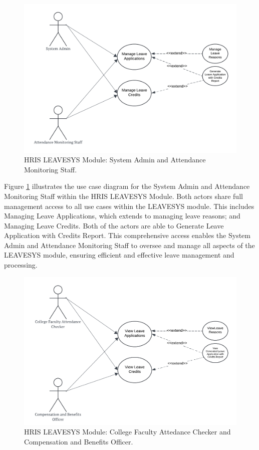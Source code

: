     \begin{figure}[H]
        \centering
        \includegraphics[width=0.9\linewidth]{figures/images/use-case-leave-1.png}
        \caption{HRIS LEAVESYS Module: System Admin and Attendance Monitoring Staff.}
        \label{fig:use-case-leave-1}
    \end{figure}

    Figure \ref{fig:use-case-leave-1} illustrates the use case diagram for the System Admin and Attendance Monitoring Staff within the HRIS LEAVESYS Module. Both actors share full management access to all use cases within the LEAVESYS module. This includes Managing Leave Applications, which extends to managing leave reasons; and Managing Leave Credits. Both of the actors are able to Generate Leave Application with Credits Report. This comprehensive access enables the System Admin and Attendance Monitoring Staff to oversee and manage all aspects of the LEAVESYS module, ensuring efficient and effective leave management and processing.

    \begin{figure}[H]
        \centering
        \includegraphics[width=0.9\linewidth]{figures/images/use-case-leave-2.png}
        \caption{HRIS LEAVESYS Module: College Faculty Attedance Checker and Compensation and Benefits Officer.}
        \label{fig:use-case-leave-2}
    \end{figure}

